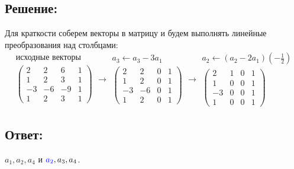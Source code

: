 \documentclass[12pt]{article}
\begin{document}
    \subsection*{Решение:}
    Для краткости соберем векторы в матрицу и будем выполнять линейные преобразования над столбцами:
    \[
        \begin{array}{c}
            \text{исходные векторы} \\
            \begin{pmatrix}
                2  & 2  & 6  & 1 \\
                1  & 2  & 3  & 1 \\
                -3 & -6 & -9 & 1 \\
                1  & 2  & 3  & 1
            \end{pmatrix}
        \end{array}
        \rightarrow
        \begin{array}{c}
            a_3 \leftarrow a_3 - 3 a_1 \\
            \begin{pmatrix}
                2  & 2  & 0 & 1 \\
                1  & 2  & 0 & 1 \\
                -3 & -6 & 0 & 1 \\
                1  & 2  & 0 & 1
            \end{pmatrix}
        \end{array}
        \rightarrow
        \begin{array}{c}
            a_2 \leftarrow \left ( a_2 - 2 a_1 \right ) \left ( - \frac{1}{2} \right ) \\
            \begin{pmatrix}
                2  & 1 & 0 & 1 \\
                1  & 0 & 0 & 1 \\
                -3 & 0 & 0 & 1 \\
                1  & 0 & 0 & 1
            \end{pmatrix}
        \end{array}
    \]

    \subsection*{Ответ:}
    $a_1, a_2, a_4$ и $\textcolor{blue}{a_2}, a_3, a_4$.
\end{document}
